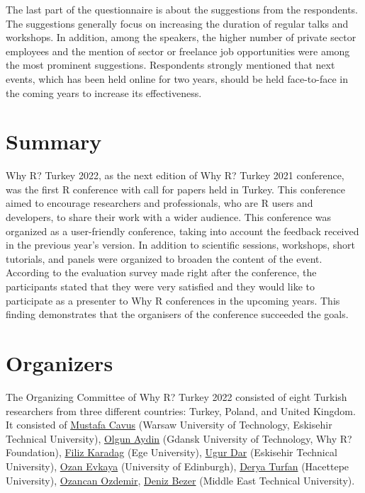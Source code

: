 The last part of the questionnaire is about the suggestions from the respondents. The suggestions generally focus on increasing the duration of regular talks and workshops. In addition, among the speakers, the higher number of private sector employees and the mention of sector or freelance job opportunities were among the most prominent suggestions. Respondents strongly mentioned that next events, which has been held online for two years, should be held face-to-face in the coming years to increase its effectiveness.

\hypertarget{summary}{%
\section{Summary}\label{summary}}

Why R? Turkey 2022, as the next edition of Why R? Turkey 2021 conference, was the first R conference with call for papers held in Turkey. This conference aimed to encourage researchers and professionals, who are R users and developers, to share their work with a wider audience. This conference was organized as a user-friendly conference, taking into account the feedback received in the previous year's version. In addition to scientific sessions, workshops, short tutorials, and panels were organized to broaden the content of the event. According to the evaluation survey made right after the conference, the participants stated that they were very satisfied and they would like to participate as a presenter to Why R conferences in the upcoming years. This finding demonstrates that the organisers of the conference succeeded the goals.

\hypertarget{organizers}{%
\section{Organizers}\label{organizers}}

The Organizing Committee of Why R? Turkey 2022 consisted of eight Turkish researchers from three different countries: Turkey, Poland, and United Kingdom. It consisted of \href{https://www.linkedin.com/in/mustafacavusphd/}{Mustafa Cavus} (Warsaw University of Technology, Eskisehir Technical University), \href{https://www.linkedin.com/in/olgun-aydin/}{Olgun Aydin} (Gdansk University of Technology, Why R? Foundation), \href{https://www.linkedin.com/in/filizkaradag/}{Filiz Karadag} (Ege University), \href{https://www.linkedin.com/in/ugurdar/}{Ugur Dar} (Eskisehir Technical University), \href{https://www.linkedin.com/in/ozanevkaya/}{Ozan Evkaya} (University of Edinburgh), \href{https://www.linkedin.com/in/derya-turfan-460498229/}{Derya Turfan} (Hacettepe University), \href{https://www.linkedin.com/in/ozancan-\%C3\%B6zdemir-40b94768/}{Ozancan Ozdemir}, \href{https://www.linkedin.com/in/deniz-bezer-55ab7519b/}{Deniz Bezer} (Middle East Technical University).

